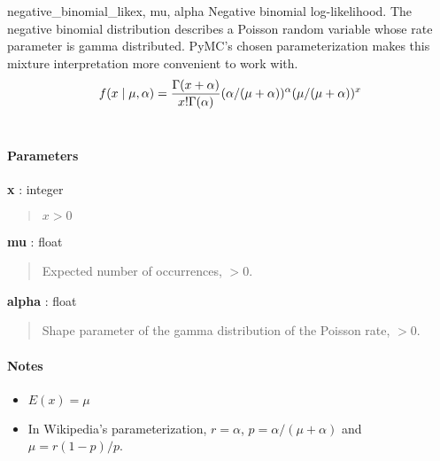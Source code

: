 \hypertarget{pymc.distributions.negative_binomial_like}{}
\begin{funcdesc}{negative\_binomial\_like}{x, mu, alpha}
Negative binomial log-likelihood. The negative binomial distribution describes a
Poisson random variable whose rate parameter is gamma distributed. PyMC's chosen
parameterization makes this mixture interpretation more convenient to work with.
\begin{gather}
\begin{split}f(x \mid \mu, \alpha) = \frac{\Gamma(x+\alpha)}{x! \Gamma(\alpha)} (\alpha/(\mu+\alpha))^\alpha (\mu/(\mu+\alpha))^x\end{split}\notag\\\begin{split}\end{split}\notag
\end{gather}
\paragraph{Parameters}
\begin{paramlist}
\item[]\textbf{x} : integer
\begin{quote}
$x>0$
\end{quote}

\item[]\textbf{mu} : float
\begin{quote}
Expected number of occurrences, $>0$.
\end{quote}

\item[]\textbf{alpha} : float
\begin{quote}
Shape parameter of the gamma distribution of the Poisson rate, $>0$.
\end{quote}
\end{paramlist}

\paragraph{Notes}
\begin{itemize}
\item {}
$E(x)=\mu$

\item {}
In Wikipedia's parameterization, $r=\alpha$, $p=\alpha/(\mu+\alpha)$ and $\mu=r(1-p)/p$.
\end{itemize}



\end{funcdesc}

